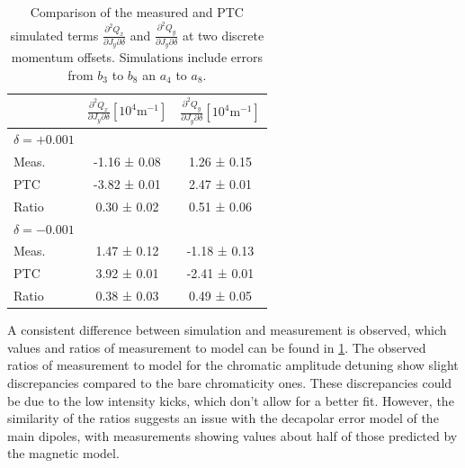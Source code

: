 \begin{table}[H]
    \centering
    \small
    \begin{tabular}{|l||c|c|}
    \hline
    & $\frac{\partial^2 Q_x}{\partial J_y \partial \delta}[10^{4}\mathrm{m}^{-1}]$ & $\frac{\partial^2 Q_y}{\partial J_y \partial \delta}[10^{4}\mathrm{m}^{-1}]$ \\
    \hline \hline
    $\delta = +0.001$ & & \\
    Meas.  &   -1.16 ± 0.08 &   1.26 ± 0.15 \\
    PTC    &   -3.82 ± 0.01 &   2.47 ± 0.01 \\
    Ratio  &    0.30 ± 0.02 &   0.51 ± 0.06 \\
    \hline
    $\delta = -0.001$ & & \\
    Meas.  &  1.47 ± 0.12  &  -1.18 ± 0.13 \\
    PTC    &  3.92 ± 0.01  &  -2.41 ± 0.01 \\
    Ratio  &  0.38 ± 0.03  &   0.49 ± 0.05 \\
    \hline
    \end{tabular}
    \caption{Comparison of the measured and PTC simulated terms $\frac{\partial^2 Q_x}{\partial J_y
    \partial \delta}$ and $\frac{\partial^2 Q_y}{\partial J_y \partial \delta}$ at two discrete
    momentum offsets. Simulations include errors from $b_3$ to $b_8$ an $a_4$ to $a_8$.}
    \label{table:decapoles:chromatic_ampdet}
\end{table}

A consistent difference between simulation and measurement is observed, which values and
ratios of measurement to model can be found in \cref{table:decapoles:chromatic_ampdet}.
The observed ratios of measurement to model for the chromatic amplitude detuning show slight
discrepancies compared to the bare chromaticity ones. These discrepancies could be due to the low
intensity kicks, which don't allow for a better fit. However, the similarity of the ratios suggests
an issue with the decapolar error model of the main dipoles, with measurements showing values about
half of those predicted by the magnetic model.